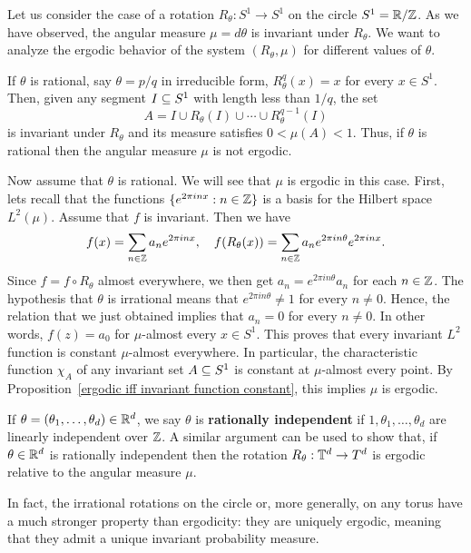 \begin{example}\label{rotation on torus erdogic}
Let us consider the case of a rotation $R_\theta:S^1\to S^1$ on the circle $S^1=\mathbb{R}/\mathbb{Z}$. As we have observed, the angular measure $\mu=d\theta$ is invariant under $R_\theta$. We want to analyze the ergodic behavior of the system $(R_\theta,\mu)$ for different values of $\theta$.\par
If $\theta$ is rational, say $\theta=p/q$ in irreducible form, $R_\theta^q(x)=x$ for every $x\in S^1$. Then, given any segment $I\subseteq S^1$ with length less than $1/q$, the set
\[A=I\cup R_\theta(I)\cup\cdots\cup R_\theta^{q-1}(I)\]
is invariant under $R_\theta$ and its measure satisfies $0<\mu(A)<1$. Thus, if $\theta$ is rational then the angular measure $\mu$ is not ergodic.\par
Now assume that $\theta$ is rational. We will see that $\mu$ is ergodic in this case. First, lets recall that the functions $\{e^{2\pi inx}:n\in\mathbb{Z}\}$ is a basis for the Hilbert space $L^2(\mu)$. Assume that $f$ is invariant. Then we have
\[f(x)=\sum_{n\in\mathbb{Z}}a_ne^{2\pi inx},\quad f(R_\theta(x))=\sum_{n\in\mathbb{Z}}a_n e^{2\pi in\theta}e^{2\pi in x}.\]
Since $f=f\circ R_\theta$ almost everywhere, we then get $a_n=e^{2\pi in\theta}a_n$ for each $n\in\mathbb{Z}$. The hypothesis that $\theta$ is irrational means that $e^{2\pi in\theta}\neq 1$ for every $n\neq 0$. Hence, the relation that we just obtained implies that $a_n=0$ for every $n\neq 0$. In other words, $f(z)=a_0$ for $\mu$-almost every $x\in S^1$. This proves that every invariant $L^2$ function is constant $\mu$-almost everywhere. In particular, the characteristic function $\chi_A$ of any invariant set $A\subseteq S^1$ is constant at $\mu$-almost every point. By Proposition~\ref{ergodic iff invariant function constant}, this implies $\mu$ is ergodic.\par
If $\theta=(\theta_1,\dots,\theta_d)\in\mathbb{R}^d$, we say $\theta$ is \textbf{rationally independent} if $1,\theta_1,\dots,\theta_d$ are linearly independent over $\mathbb{Z}$. A similar argument can be used to show that, if $\theta\in\mathbb{R}^d$ is rationally independent then the rotation $R_\theta:\mathbb{T}^d\to T^d$ is ergodic relative to the angular measure $\mu$.\par
In fact, the irrational rotations on the circle or, more generally, on any torus have a much stronger property than ergodicity: they are uniquely ergodic, meaning that they admit a unique invariant probability measure. 
\end{example}
